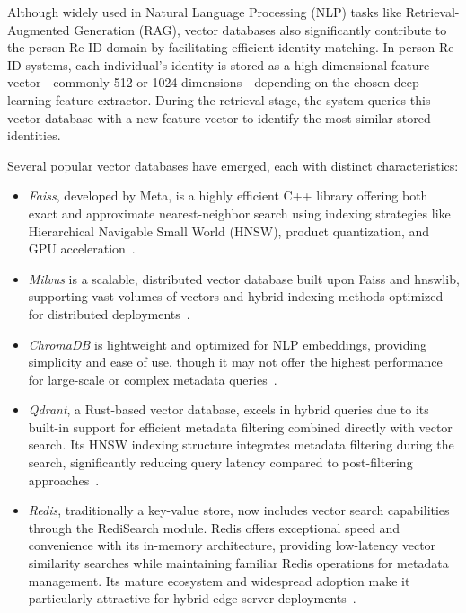 \documentclass[../main.tex]{subfiles}
\begin{document}
Although widely used in Natural Language Processing (NLP) tasks like Retrieval-Augmented Generation (RAG), vector databases also significantly contribute to the person Re-ID domain by facilitating efficient identity matching. In person Re-ID systems, each individual's identity is stored as a high-dimensional feature vector—commonly 512 or 1024 dimensions—depending on the chosen deep learning feature extractor. During the retrieval stage, the system queries this vector database with a new feature vector to identify the most similar stored identities.

Several popular vector databases have emerged, each with distinct characteristics:

\begin{itemize}
  \item \textit{Faiss}, developed by Meta, is a highly efficient C++ library offering both exact and approximate nearest-neighbor search using indexing strategies like Hierarchical Navigable Small World (HNSW), product quantization, and GPU acceleration~\cite{faiss}.
  
  \item \textit{Milvus} is a scalable, distributed vector database built upon Faiss and hnswlib, supporting vast volumes of vectors and hybrid indexing methods optimized for distributed deployments~\cite{milvus}.
  
  \item \textit{ChromaDB} is lightweight and optimized for NLP embeddings, providing simplicity and ease of use, though it may not offer the highest performance for large-scale or complex metadata queries~\cite{chromadb}.
  
  \item \textit{Qdrant}, a Rust-based vector database, excels in hybrid queries due to its built-in support for efficient metadata filtering combined directly with vector search. Its HNSW indexing structure integrates metadata filtering during the search, significantly reducing query latency compared to post-filtering approaches~\cite{qdrant}.
  
  \item \textit{Redis}, traditionally a key-value store, now includes vector search capabilities through the RediSearch module. Redis offers exceptional speed and convenience with its in-memory architecture, providing low-latency vector similarity searches while maintaining familiar Redis operations for metadata management. Its mature ecosystem and widespread adoption make it particularly attractive for hybrid edge-server deployments~\cite{redis_vector}.
  
  
\end{itemize}
\end{document}
